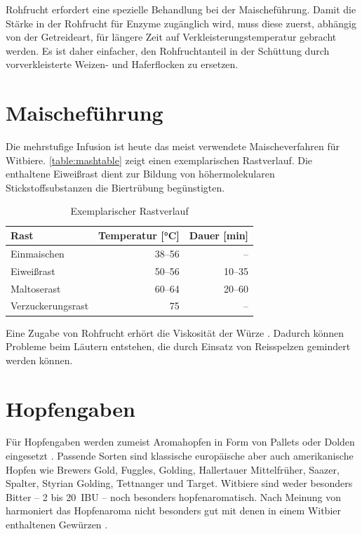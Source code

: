 \documentclass[a4paper,parskip=half]{scrartcl}
\begin{document}
Rohfrucht erfordert eine spezielle Behandlung bei der Maischeführung. Damit
die Stärke in der Rohfrucht für Enzyme zugänglich wird, muss diese zuerst,
abhängig von der Getreideart, für längere Zeit auf Verkleisterungstemperatur
gebracht werden. Es ist daher einfacher, den Rohfruchtanteil in der Schüttung
durch vorverkleisterte Weizen- und Haferflocken zu ersetzen.


\section*{Maischeführung}

Die mehrstufige Infusion ist heute das meist verwendete Maischeverfahren
für Witbiere. \autoref{table:mashtable}
zeigt einen exemplarischen Rastverlauf. Die enthaltene
Eiweißrast dient zur Bildung von höhermolekularen Stickstoffsubstanzen die
Biertrübung begünstigten. \parencite[12,16]{Strottner1999}

\begin{table}[H]
\centering
\begin{tabular}{lrr}
\toprule
Rast              & Temperatur [°C] & Dauer [min] \\
\midrule
Einmaischen       & 38–56          & –     \\
Eiweißrast        & 50–56          & 10–35 \\
Maltoserast       & 60–64          & 20–60 \\
Verzuckerungsrast & 75             & –     \\
\bottomrule
\end{tabular}
\caption{Exemplarischer Rastverlauf \parencite[16]{Strottner1999}}
\label{table:mashtable}
\end{table}

Eine Zugabe von Rohfrucht erhört die Viskosität der Würze \parencite[9]{Strottner1999}.
Dadurch können Probleme beim Läutern entstehen, die durch Einsatz von
Reisspelzen gemindert werden können.

\section*{Hopfengaben}

Für Hopfengaben werden zumeist Aromahopfen in Form von Pallets
oder Dolden eingesetzt \parencite[1]{Strottner1999}. Passende
Sorten sind klassische europäische aber auch amerikanische
Hopfen wie Brewers Gold, Fuggles, Golding, Hallertauer Mittelfrüher,
Saazer, Spalter, Styrian Golding, Tettnanger und Target.
Witbiere sind weder besonders Bitter – 2 bis 20~IBU – noch
besonders hopfenaromatisch. Nach Meinung von \citeauthor{Zainasheff2007}
harmoniert das Hopfenaroma nicht besonders gut mit denen in einem Witbier
enthaltenen Gewürzen \parencite{Zainasheff2007}.
\end{document}
